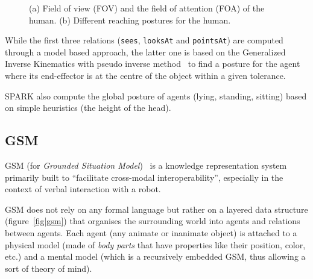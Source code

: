 \documentclass[a4paper]{article}
\begin{document}
\begin{figure}[!t]
    \begin{center}
    \caption{(a) Field of view (FOV) and the field of attention (FOA) of the
    human. (b) Different reaching postures for the human.}
    \label{fig::sparkRepresentations}
    \end{center}
\end{figure} 


While the first three relations (\texttt{sees}, \texttt{looksAt} and
\texttt{pointsAt}) are computed through a model based approach, the latter one
is based on the Generalized Inverse Kinematics with pseudo inverse
method~\cite{Nakamura90,Baerlocher04} to find a posture for the
agent where its end-effector is at the centre of the object within a given
tolerance.

SPARK also compute the global posture of agents (lying, standing, sitting)
based on simple heuristics (the height of the head).


\subsection{GSM}
\label{sect|gsm}

GSM (for \emph{Grounded Situation Model})~\cite{Mavridis2006} is a knowledge
representation system primarily built to ``facilitate cross-modal
interoperability'',  especially in the context of verbal interaction with a
robot.

GSM does not rely on any formal language but rather on a layered data structure
(figure~\ref{fig|gsm}) that organises the surrounding world into agents and
relations between agents.  Each agent (any animate or inanimate object) is
attached to a physical model (made of \emph{body parts} that have properties
like their position, color, etc.) and a mental model (which is a recursively
embedded GSM, thus allowing a sort of theory of mind).
\end{document}
